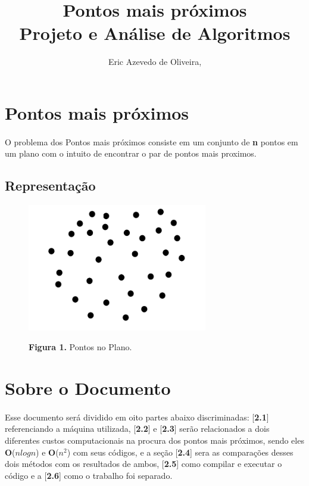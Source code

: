 \documentclass[12pt]{article}
\title{Pontos mais próximos \\ Projeto e Análise de Algoritmos}
\author{Eric Azevedo de Oliveira\inst{1},}
\begin{document}
\maketitle
\section{Pontos mais próximos}
\paragraph{}O problema dos Pontos mais próximos  consiste em  um conjunto de \textbf{n} pontos em um plano com o intuito de encontrar o par de pontos mais proximos.
\subsection{Representação}



\begin{center}
    \begin{figure}[h!]
        \centering
        \includegraphics[width=0.7\textwidth]{imagens/Pontos.png}
        
        
        \textbf{Figura 1.} Pontos no Plano.
    \end{figure}
\end{center}


\section{Sobre o Documento}
\paragraph{}Esse documento será dividido em oito  partes abaixo discriminadas: [\textbf{2.1}]  referenciando a máquina utilizada, [\textbf{2.2}] e [\textbf{2.3}] serão relacionados a dois diferentes custos computacionais na procura dos pontos mais próximos, sendo eles \textbf{O}($nlogn$) e \textbf{O}($n^{2}$) com seus códigos, e a seção [\textbf{2.4}] sera as comparações desses dois métodos com os resultados de ambos, [\textbf{2.5}] como compilar e executar o código e a [\textbf{2.6}] como o trabalho foi separado.
\end{document}
